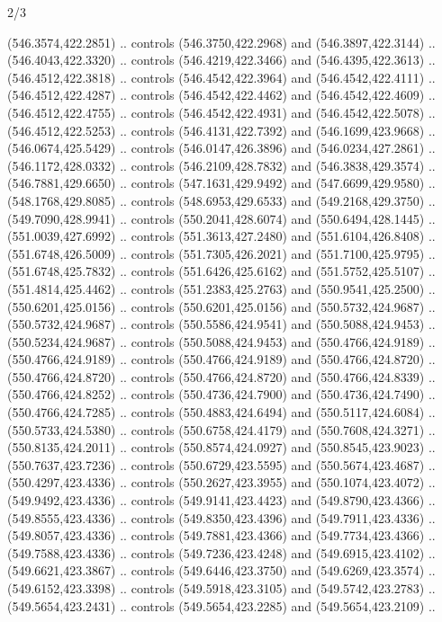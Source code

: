 \begin{flagdescription}{2/3}
\begin{scope}[xshift=0.5\flaglength,yshift=0.5\flagwidth,scale=\flagwidth/495.65]
\begin{scope}[y=0.8pt, x=0.8pt, yscale=-1,shift={(-463.76,-309.78)}]
  (546.3574,422.2851) .. controls (546.3750,422.2968) and (546.3897,422.3144) ..
  (546.4043,422.3320) .. controls (546.4219,422.3466) and (546.4395,422.3613) ..
  (546.4512,422.3818) .. controls (546.4542,422.3964) and (546.4542,422.4111) ..
  (546.4512,422.4287) .. controls (546.4542,422.4462) and (546.4542,422.4609) ..
  (546.4512,422.4755) .. controls (546.4542,422.4931) and (546.4542,422.5078) ..
  (546.4512,422.5253) .. controls (546.4131,422.7392) and (546.1699,423.9668) ..
  (546.0674,425.5429) .. controls (546.0147,426.3896) and (546.0234,427.2861) ..
  (546.1172,428.0332) .. controls (546.2109,428.7832) and (546.3838,429.3574) ..
  (546.7881,429.6650) .. controls (547.1631,429.9492) and (547.6699,429.9580) ..
  (548.1768,429.8085) .. controls (548.6953,429.6533) and (549.2168,429.3750) ..
  (549.7090,428.9941) .. controls (550.2041,428.6074) and (550.6494,428.1445) ..
  (551.0039,427.6992) .. controls (551.3613,427.2480) and (551.6104,426.8408) ..
  (551.6748,426.5009) .. controls (551.7305,426.2021) and (551.7100,425.9795) ..
  (551.6748,425.7832) .. controls (551.6426,425.6162) and (551.5752,425.5107) ..
  (551.4814,425.4462) .. controls (551.2383,425.2763) and (550.9541,425.2500) ..
  (550.6201,425.0156) .. controls (550.6201,425.0156) and (550.5732,424.9687) ..
  (550.5732,424.9687) .. controls (550.5586,424.9541) and (550.5088,424.9453) ..
  (550.5234,424.9687) .. controls (550.5088,424.9453) and (550.4766,424.9189) ..
  (550.4766,424.9189) .. controls (550.4766,424.9189) and (550.4766,424.8720) ..
  (550.4766,424.8720) .. controls (550.4766,424.8720) and (550.4766,424.8339) ..
  (550.4766,424.8252) .. controls (550.4736,424.7900) and (550.4736,424.7490) ..
  (550.4766,424.7285) .. controls (550.4883,424.6494) and (550.5117,424.6084) ..
  (550.5733,424.5380) .. controls (550.6758,424.4179) and (550.7608,424.3271) ..
  (550.8135,424.2011) .. controls (550.8574,424.0927) and (550.8545,423.9023) ..
  (550.7637,423.7236) .. controls (550.6729,423.5595) and (550.5674,423.4687) ..
  (550.4297,423.4336) .. controls (550.2627,423.3955) and (550.1074,423.4072) ..
  (549.9492,423.4336) .. controls (549.9141,423.4423) and (549.8790,423.4366) ..
  (549.8555,423.4336) .. controls (549.8350,423.4396) and (549.7911,423.4336) ..
  (549.8057,423.4336) .. controls (549.7881,423.4366) and (549.7734,423.4366) ..
  (549.7588,423.4336) .. controls (549.7236,423.4248) and (549.6915,423.4102) ..
  (549.6621,423.3867) .. controls (549.6446,423.3750) and (549.6269,423.3574) ..
  (549.6152,423.3398) .. controls (549.5918,423.3105) and (549.5742,423.2783) ..
  (549.5654,423.2431) .. controls (549.5654,423.2285) and (549.5654,423.2109) ..

\end{scope}
\end{scope}
\end{flagdescription}

